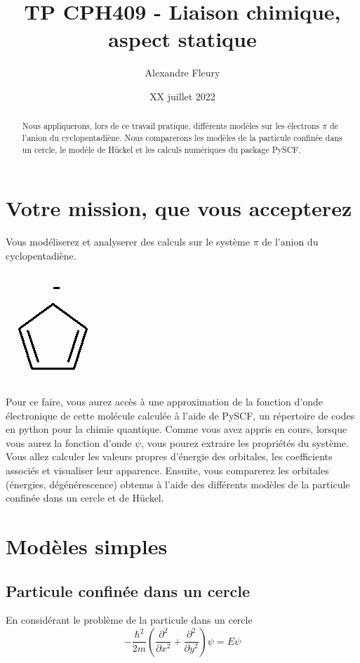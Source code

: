 \documentclass[12pt,letterpaper]{article}
\title{TP CPH409 - Liaison chimique, aspect statique}
\author{Alexandre Fleury}
\date{XX juillet 2022}
\newenvironment{problematique}{
\renewcommand{\abstractname}{But}
\begin{abstract}
}{
\end{abstract}
}
\begin{document}
\renewcommand{\labelitemi}{$\bullet$}
\maketitle

\begin{problematique}
Nous appliquerons, lors de ce travail pratique, différents modèles sur les électrons $\pi$ de l'anion du cyclopentadiène. Nous comparerons les modèles de la particule confinée dans un cercle, le modèle de Hückel et les calculs numériques du package PySCF.
\end{problematique}

\section*{Votre mission, que vous accepterez}
Vous modéliserez et analyserer des calculs sur le système $\pi$ de l'anion du cyclopentadiène.
\begin{center}
  \includegraphics[width=.1\linewidth]{clyclopentadiene_anion.png}
\end{center}

Pour ce faire, vous aurez accès à une approximation de la fonction d'onde électronique de cette molécule calculée à l'aide de PySCF, un répertoire de codes en python pour la chimie quantique. Comme vous avez appris en cours, lorsque vous aurez la fonction d'onde $\psi$, vous pourez extraire les propriétés du système. Vous allez calculer les valeurs propres  d'énergie des orbitales, les coefficients associés et visualiser leur apparence. Ensuite, vous comparerez les orbitales (énergies, dégénérescence) obtenus à l'aide des différents modèles de la particule confinée dans un cercle et de Hückel.

\section*{Modèles simples}
\subsection*{Particule confinée dans un cercle}

En considérant le problème de la particule dans un cercle
\begin{equation}
-\frac{\hbar^2}{2m} \left( \frac{\partial^2}{\partial x^2} + \frac{\partial^2}{\partial y^2} \right) \psi = E \psi
\end{equation}
\end{document}
